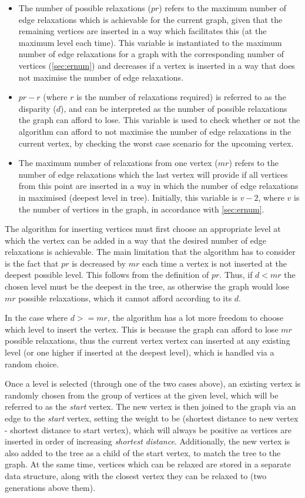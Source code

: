 \documentclass{l4proj}
\begin{document}
\begin{itemize}
	\item
	The number of possible relaxations ($pr$) refers to the maximum number of edge relaxations which is achievable for the current graph, given that the remaining vertices are inserted in a way which facilitates this (at the maximum level each time). This variable is instantiated to the maximum number of edge relaxations for a graph with the corresponding number of vertices (\autoref{sec:ernum}) and decreases if a vertex is inserted in a way that does not maximise the number of edge relaxations. 
	\item
	$pr-r$ (where $r$ is the number of relaxations required) is referred to as the disparity ($d$), and can be interpreted as the number of possible relaxations the graph can afford to lose. This variable is used to check whether or not the algorithm can afford to not maximise the number of edge relaxations in the current vertex, by checking the worst case scenario for the upcoming vertex.
	\item
	The maximum number of relaxations from one vertex ($mr$) refers to the number of edge relaxations which the last vertex will provide if all vertices from this point are inserted in a way in which the number of edge relaxations in maximised (deepest level in tree). Initially, this variable is $v-2$, where $v$ is the number of vertices in the graph, in accordance with \autoref{sec:ernum}.
\end{itemize}

The algorithm for inserting vertices must first choose an appropriate level at which the vertex can be added in a way that the desired number of edge relaxations is achievable. The main limitation that the algorithm has to consider is the fact that $pr$ is decreased by $mr$ each time a vertex is not inserted at the deepest possible level. This follows from the definition of $pr$. Thus, if $d < mr$ the chosen level must be the deepest in the tree, as otherwise the graph would lose $mr$ possible relaxations, which it cannot afford according to its $d$. 

In the case where $d >= mr$, the algorithm has a lot more freedom to choose which level to insert the vertex. This is because the graph can afford to lose $mr$ possible relaxations, thus the current vertex vertex can inserted at any existing level (or one higher if inserted at the deepest level), which is handled via a random choice. 

Once a level is selected (through one of the two cases above), an existing vertex is randomly chosen from the group of vertices at the given level, which will be referred to as the \emph{start} vertex. The new vertex is then joined to the graph via an edge to the \emph{start} vertex, setting the weight to be (shortest distance to new vertex - shortest distance to start vertex), which will always be positive as vertices are inserted in order of increasing \emph{shortest distance}.  Additionally, the new vertex is also added to the tree as a child of the start vertex, to match the tree to the graph. At the same time, vertices which can be relaxed are stored in a separate data structure, along with the closest vertex they can be relaxed to (two generations above them).
\end{document}
